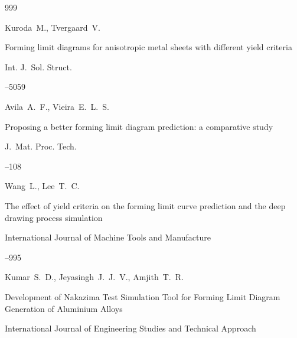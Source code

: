 \begin{thebibliography}{999}

\by Kuroda~M., Tvergaard~V.  

\paper Forming limit diagrams for anisotropic metal sheets with different yield criteria

\jour Int. J.~Sol. Struct.




–5059






\by Avila~A.~F., Vieira~E.~L.~S.  

\paper Proposing a better forming limit diagram prediction: a comparative study

\jour J.~Mat. Proc. Tech.




–108






\by Wang~L., Lee~T.~C.  

\paper The effect of yield criteria on the forming limit curve prediction and the deep drawing process simulation

\jour International Journal of Machine Tools and Manufacture




–995






\by Kumar~S.~D., Jeyasingh~J.~J.~V., Amjith~T.~R.

\paper Development of Nakazima Test Simulation Tool for Forming Limit Diagram Generation of Aluminium Alloys

\jour International Journal of Engineering Studies and Technical Approach


\end{thebibliography}
